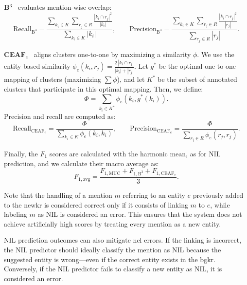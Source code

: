 \medskip
\noindent\textbf{B$^3$}~\cite{bagga-baldwin-1998} evaluates mention-wise overlap:
\begin{equation}
\text{Recall}_{\text{B}^3} =
\frac{
\sum_{k_i \in K} \sum_{r_j \in R} \frac{|k_i \cap r_j|^2}{|k_i|}
}{
\sum_{k_i \in K} |k_i|
}, \qquad
\text{Precision}_{\text{B}^3} =
\frac{
\sum_{k_i \in K} \sum_{r_j \in R} \frac{|k_i \cap r_j|^2}{|r_j|}
}{
\sum_{r_j \in R} |r_j|
}.
\end{equation}

\noindent\textbf{CEAF$_e$}~\cite{luo2005coreference} aligns clusters one-to-one by maximizing a similarity $\phi$.  
We use the entity-based similarity $\phi_e(k_i,r_j)= \frac{2\,|k_i\cap r_j|}{|k_i|+|r_j|}$. Let $g^*$ be the optimal
one-to-one mapping of clusters (maximizing $\sum \phi$), and let $K^*$ be the subset of annotated clusters
that participate in this optimal mapping. Then, we define:
\begin{equation}
\Phi = \sum_{k_i \in K^*} \phi_e(k_i, g^*(k_i)).
\end{equation}
Precision and recall are computed as:
\begin{equation}
\text{Recall}_{\text{CEAF}_e} =
\frac{\Phi}{\sum_{k_i \in K} \phi_e(k_i,k_i)}, \qquad
\text{Precision}_{\text{CEAF}_e} =
\frac{\Phi}{\sum_{r_j \in R} \phi_e(r_j,r_j)}.
\end{equation}


\medskip
Finally, the $F_1$ scores are calculated with the harmonic mean, as for NIL prediction, and we calculate their macro average as:
\begin{equation}
F_{1,\text{avg}} =
\frac{F_{1,\text{MUC}} + F_{1,\text{B}^3} + F_{1,\text{CEAF}_e}}{3}.
\end{equation}




Note that the handling of a mention $m$ referring to an entity $e$ previously added to the \ac{newkr} is considered correct only if it consists of linking $m$ to $e$, while labeling $m$ as NIL is considered an error. This ensures that the system does not achieve artificially high scores by treating every mention as a new entity.

NIL prediction outcomes can also mitigate \ac{nel} errors. If the linking is incorrect, the NIL predictor should ideally classify the mention as NIL because the suggested entity is wrong---even if the correct entity exists in the \ac{bgkr}. Conversely, if the NIL predictor fails to classify a new entity as NIL, it is considered an error.

